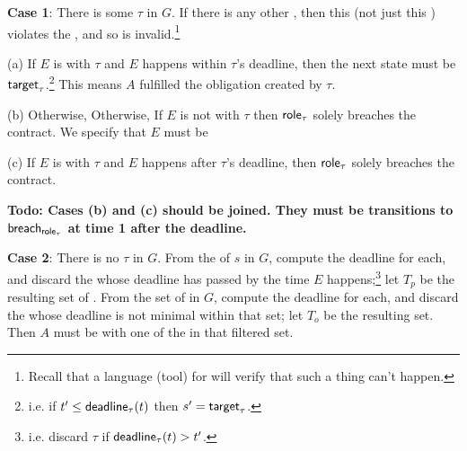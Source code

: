 \documentclass[12pt]{article}
\begin{document}
{\bf Case 1}: There is some \enabled \mustntran $\tau$ in $G$. If there is any other \enabled \transition, then this \Contract (not just this \trace) violates the \uaoc, and so is invalid.\footnote{Recall that a language (tool) for \FSContracts will verify that such a thing can't happen.} 
\begin{LPPI}
    \item[(a)] If $E$ is \compatible with $\tau$ and $E$ happens within $\tau$'s deadline, then the next state must be $\textsf{target}_{\tau}$.\footnote{i.e. if $t' \leq \textsf{deadline}_{\tau}(t)$ then $s' = \textsf{target}_{\tau}$.} This means $A$ fulfilled the obligation created by $\tau$.
    \item[(b)] Otherwise, Otherwise, If $E$ is not \compatible with $\tau$ then $\textsf{role}_{\tau}$ solely breaches the contract. We specify that $E$ must be 
    \item[(c)] If $E$ is \compatible with $\tau$ and $E$ happens after $\tau$'s deadline, then $\textsf{role}_{\tau}$ solely breaches the contract. 
\end{LPPI}
{\bf Todo: Cases (b) and (c) should be joined. They must be transitions to $\textsf{breach}_{\textsf{role}_{\tau}}$ at time 1 after the deadline.}

{\bf Case 2}: There is no \enabled \mustntran $\tau$ in $G$. From the \enabled \mayntrans of $s$ in $G$, compute the deadline for each, and discard the \transitions whose deadline has passed by the time $E$ happens;\footnote{i.e. discard $\tau$ if $\textsf{deadline}_{\tau}(t) > t'$.}  let $T_p$ be the resulting set of \transitions. From the set of \enabled \rmustntrans in $G$, compute the deadline for each, and discard the \transitions whose deadline is not minimal within that set; let $T_o$ be the resulting set. Then $A$ must be \compatible with one of the \transitions in that filtered set.
\end{document}
